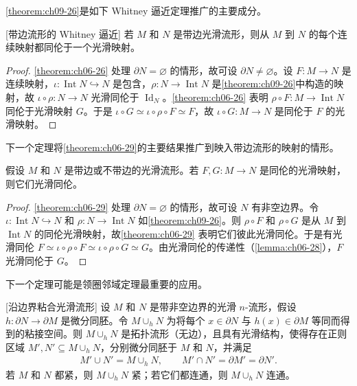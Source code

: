 \documentclass[../../main.tex]{subfiles}
\begin{document}
\cref{theorem:ch09-26}是如下 Whitney 逼近定理推广的主要成分。

\begin{theorem}\label{theorem:ch09-27}[带边流形的 Whitney 逼近]
若 $M$ 和 $N$ 是带边光滑流形，则从 $M$ 到 $N$ 的每个连续映射都同伦于一个光滑映射。
\end{theorem}

\begin{proof}
\cref{theorem:ch06-26} 处理 $\partial N=\varnothing $ 的情形，故可设 $\partial N\neq\varnothing $。设 $F\colon M\to N$ 是连续映射，$\iota\colon\operatorname{Int}N\hookrightarrow N$ 是包含，$\rho\colon N\to\operatorname{Int}N$ 是\cref{theorem:ch09-26}中构造的映射，故 $\iota\circ\rho\colon N\to N$ 光滑同伦于 $\operatorname{Id}_N$。\cref{theorem:ch06-26} 表明 $\rho\circ F\colon M\to\operatorname{Int}N$ 同伦于光滑映射 $G$。于是 $\iota\circ G\simeq\iota\circ\rho\circ F\simeq F$，故 $\iota\circ G\colon M\to N$ 是同伦于 $F$ 的光滑映射。
\end{proof}

下一个定理将\cref{theorem:ch06-29}的主要结果推广到映入带边流形的映射的情形。

\begin{theorem}\label{theorem:ch09-28}
假设 $M$ 和 $N$ 是带边或不带边的光滑流形。若 $F,G\colon M\to N$ 是同伦的光滑映射，则它们光滑同伦。
\end{theorem}

\begin{proof}
\cref{theorem:ch06-29} 处理 $\partial N=\varnothing $ 的情形，故可设 $N$ 有非空边界。令 $\iota\colon\operatorname{Int}N\hookrightarrow N$ 和 $\rho\colon N\to\operatorname{Int}N$ 如\cref{theorem:ch09-26}。则 $\rho\circ F$ 和 $\rho\circ G$ 是从 $M$ 到 $\operatorname{Int}N$ 的同伦光滑映射，故\cref{theorem:ch06-29} 表明它们彼此光滑同伦。于是有光滑同伦 $F\simeq\iota\circ\rho\circ F\simeq\iota\circ\rho\circ G\simeq G$。由光滑同伦的传递性（\cref{lemma:ch06-28}），$F$ 光滑同伦于 $G$。
\end{proof}

下一个定理可能是领圈邻域定理最重要的应用。

\begin{theorem}\label{theorem:ch09-29}[沿边界粘合光滑流形]
设 $M$ 和 $N$ 是带非空边界的光滑 $n$-流形，假设 $h\colon\partial N\to\partial M$ 是微分同胚。令 $M\cup_h N$ 为将每个 $x\in\partial N$ 与 $h(x)\in\partial M$ 等同而得到的粘接空间。则 $M\cup_h N$ 是拓扑流形（无边），且具有光滑结构，使得存在正则区域 $M',N'\subseteq M\cup_h N$，分别微分同胚于 $M$ 和 $N$，并满足
\begin{align}
M'\cup N'=M\cup_h N,\qquad M'\cap N'=\partial M'=\partial N'. \label{align:ch09-14}
\end{align}
若 $M$ 和 $N$ 都紧，则 $M\cup_h N$ 紧；若它们都连通，则 $M\cup_h N$ 连通。
\end{theorem}
\end{document}
